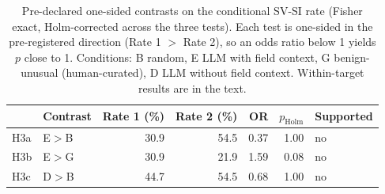 \begin{table}[t]
\caption{Pre-declared one-sided contrasts on the conditional SV-SI rate (Fisher exact, Holm-corrected
across the three tests). Each test is one-sided in the pre-registered direction (Rate 1 $>$ Rate 2), so
an odds ratio below 1 yields $p$ close to 1. Conditions: B random, E LLM with field context,
G benign-unusual (human-curated), D LLM without field context. Within-target results are in the text.}
\label{tab:contrasts}
\centering
\footnotesize
\setlength{\tabcolsep}{3pt}
\begin{tabular}{llrrrrl}
\toprule
 & Contrast & Rate 1 (\%) & Rate 2 (\%) & OR & $p_{\mathrm{Holm}}$ & Supported \\
\midrule
H3a & E$>$B & 30.9 & 54.5 & 0.37 & 1.00 & no \\
H3b & E$>$G & 30.9 & 21.9 & 1.59 & 0.08 & no \\
H3c & D$>$B & 44.7 & 54.5 & 0.68 & 1.00 & no \\
\bottomrule
\end{tabular}
\end{table}
